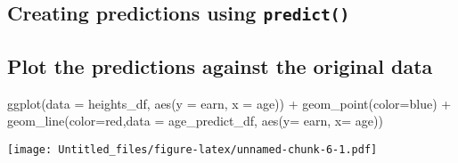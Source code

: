 \documentclass[
]{article}
\newenvironment{Shaded}{\begin{snugshade}}{\end{snugshade}}
\newcommand{\AttributeTok}[1]{\textcolor[rgb]{0.77,0.63,0.00}{#1}}
\newcommand{\FunctionTok}[1]{\textcolor[rgb]{0.00,0.00,0.00}{#1}}
\newcommand{\NormalTok}[1]{#1}
\newcommand{\OtherTok}[1]{\textcolor[rgb]{0.56,0.35,0.01}{#1}}
\newcommand{\SpecialCharTok}[1]{\textcolor[rgb]{0.00,0.00,0.00}{#1}}
\newcommand{\StringTok}[1]{\textcolor[rgb]{0.31,0.60,0.02}{#1}}
\begin{document}
\hypertarget{creating-predictions-using-predict}{%
\subsection{\texorpdfstring{Creating predictions using
\texttt{predict()}}{Creating predictions using predict()}}\label{creating-predictions-using-predict}}

\begin{Shaded}
\end{Shaded}

\hypertarget{plot-the-predictions-against-the-original-data}{%
\subsection{Plot the predictions against the original
data}\label{plot-the-predictions-against-the-original-data}}

\begin{Shaded}
\begin{Highlighting}[]
\FunctionTok{ggplot}\NormalTok{(}\AttributeTok{data =}\NormalTok{ heights\_df, }\FunctionTok{aes}\NormalTok{(}\AttributeTok{y =}\NormalTok{ earn, }\AttributeTok{x =}\NormalTok{ age)) }\SpecialCharTok{+}
  \FunctionTok{geom\_point}\NormalTok{(}\AttributeTok{color=}\StringTok{\textquotesingle{}blue\textquotesingle{}}\NormalTok{) }\SpecialCharTok{+}
  \FunctionTok{geom\_line}\NormalTok{(}\AttributeTok{color=}\StringTok{\textquotesingle{}red\textquotesingle{}}\NormalTok{,}\AttributeTok{data =}\NormalTok{ age\_predict\_df, }\FunctionTok{aes}\NormalTok{(}\AttributeTok{y=}\NormalTok{ earn, }\AttributeTok{x=}\NormalTok{ age))}
\end{Highlighting}
\end{Shaded}

\texttt{[image: Untitled\_files/figure-latex/unnamed-chunk-6-1.pdf]}

\begin{Shaded}
\end{Shaded}
\end{document}
